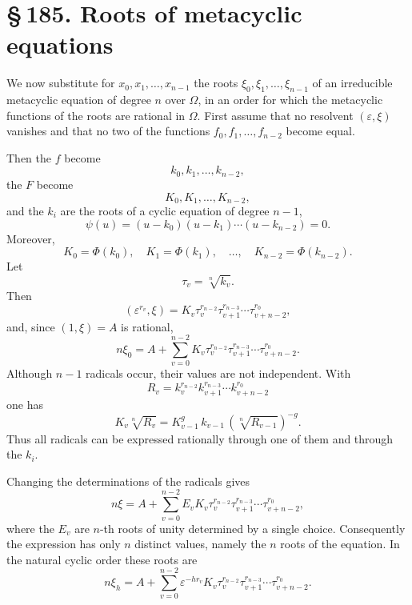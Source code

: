 \documentclass[11pt]{article}
\newcommand{\sect}[2]{\section*{\S\,#1. #2}}
\newcommand{\eps}{\varepsilon}
\newcommand{\Om}{\Omega}
\begin{document}
\sect{185}{Roots of metacyclic equations}

We now substitute for $x_0,x_1,\ldots,x_{n-1}$ the roots $\xi_0,\xi_1,\ldots,\xi_{n-1}$ of an irreducible metacyclic equation of degree $n$ over $\Om$, in an order for which the metacyclic functions of the roots are rational in $\Om$. First assume that no resolvent $(\eps,\xi)$ vanishes and that no two of the functions $f_0,f_1,
\ldots,f_{n-2}$ become equal.

Then the $f$ become
\[
  k_0,k_1,\ldots,k_{n-2},
\]
the $F$ become
\[
  K_0,K_1,\ldots,K_{n-2},
\]
and the $k_i$ are the roots of a cyclic equation of degree $n-1$,
\begin{equation}
  \psi(u)=(u-k_0)(u-k_1)\cdots(u-k_{n-2})=0.
\end{equation}
Moreover,
\begin{equation}
  K_0=\Phi(k_0),\quad K_1=\Phi(k_1),\quad\ldots,\quad
  K_{n-2}=\Phi(k_{n-2}).
\end{equation}
Let
\begin{equation}
  \tau_v=\sqrt[n]{k_v}.
\end{equation}
Then
\begin{equation}
  (\eps^{r_v},\xi)=K_v\tau_v^{r_{n-2}}\tau_{v+1}^{r_{n-3}}
  \cdots\tau_{v+n-2}^{r_0},
\end{equation}
and, since $(1,\xi)=A$ is rational,
\begin{equation}
  n\xi_0=A+
  \sum_{v=0}^{n-2}K_v\tau_v^{r_{n-2}}\tau_{v+1}^{r_{n-3}}
  \cdots\tau_{v+n-2}^{r_0}.
\end{equation}
Although $n-1$ radicals occur, their values are not independent. With
\begin{equation}
  R_v=k_v^{r_{n-2}}k_{v+1}^{r_{n-3}}\cdots k_{v+n-2}^{r_0}
\end{equation}
one has
\begin{equation}
  K_v\sqrt[n]{R_v}=K_{v-1}^{g}\,k_{v-1}\,(\sqrt[n]{R_{v-1}})^{-g}.
\end{equation}
Thus all radicals can be expressed rationally through one of them and through the $k_i$.

Changing the determinations of the radicals gives
\begin{equation}
  n\xi=A+
  \sum_{v=0}^{n-2}E_vK_v\tau_v^{r_{n-2}}\tau_{v+1}^{r_{n-3}}
  \cdots\tau_{v+n-2}^{r_0},
\end{equation}
where the $E_v$ are $n$-th roots of unity determined by a single choice. Consequently the expression has only $n$ distinct values, namely the $n$ roots of the equation. In the natural cyclic order these roots are
\begin{equation}
  n\xi_h=A+
  \sum_{v=0}^{n-2}\eps^{-hr_v}K_v\tau_v^{r_{n-2}}\tau_{v+1}^{r_{n-3}}
  \cdots\tau_{v+n-2}^{r_0}.
\end{equation}
\end{document}
